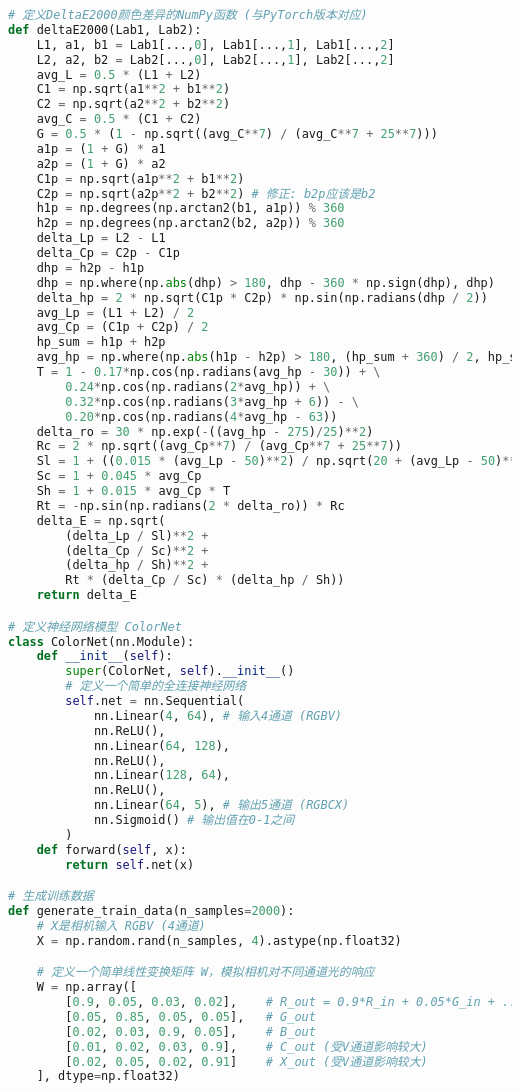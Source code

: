 \begin{lstlisting}[language=Python]
# 定义DeltaE2000颜色差异的NumPy函数 (与PyTorch版本对应)
def deltaE2000(Lab1, Lab2):
    L1, a1, b1 = Lab1[...,0], Lab1[...,1], Lab1[...,2]
    L2, a2, b2 = Lab2[...,0], Lab2[...,1], Lab2[...,2]
    avg_L = 0.5 * (L1 + L2)
    C1 = np.sqrt(a1**2 + b1**2)
    C2 = np.sqrt(a2**2 + b2**2)
    avg_C = 0.5 * (C1 + C2)
    G = 0.5 * (1 - np.sqrt((avg_C**7) / (avg_C**7 + 25**7)))
    a1p = (1 + G) * a1
    a2p = (1 + G) * a2
    C1p = np.sqrt(a1p**2 + b1**2)
    C2p = np.sqrt(a2p**2 + b2**2) # 修正: b2p应该是b2
    h1p = np.degrees(np.arctan2(b1, a1p)) % 360
    h2p = np.degrees(np.arctan2(b2, a2p)) % 360
    delta_Lp = L2 - L1
    delta_Cp = C2p - C1p
    dhp = h2p - h1p
    dhp = np.where(np.abs(dhp) > 180, dhp - 360 * np.sign(dhp), dhp)
    delta_hp = 2 * np.sqrt(C1p * C2p) * np.sin(np.radians(dhp / 2))
    avg_Lp = (L1 + L2) / 2
    avg_Cp = (C1p + C2p) / 2
    hp_sum = h1p + h2p
    avg_hp = np.where(np.abs(h1p - h2p) > 180, (hp_sum + 360) / 2, hp_sum / 2)
    T = 1 - 0.17*np.cos(np.radians(avg_hp - 30)) + \
        0.24*np.cos(np.radians(2*avg_hp)) + \
        0.32*np.cos(np.radians(3*avg_hp + 6)) - \
        0.20*np.cos(np.radians(4*avg_hp - 63))
    delta_ro = 30 * np.exp(-((avg_hp - 275)/25)**2)
    Rc = 2 * np.sqrt((avg_Cp**7) / (avg_Cp**7 + 25**7))
    Sl = 1 + ((0.015 * (avg_Lp - 50)**2) / np.sqrt(20 + (avg_Lp - 50)**2))
    Sc = 1 + 0.045 * avg_Cp
    Sh = 1 + 0.015 * avg_Cp * T
    Rt = -np.sin(np.radians(2 * delta_ro)) * Rc
    delta_E = np.sqrt(
        (delta_Lp / Sl)**2 +
        (delta_Cp / Sc)**2 +
        (delta_hp / Sh)**2 +
        Rt * (delta_Cp / Sc) * (delta_hp / Sh))
    return delta_E

# 定义神经网络模型 ColorNet
class ColorNet(nn.Module):
    def __init__(self):
        super(ColorNet, self).__init__()
        # 定义一个简单的全连接神经网络
        self.net = nn.Sequential(
            nn.Linear(4, 64), # 输入4通道 (RGBV)
            nn.ReLU(),
            nn.Linear(64, 128),
            nn.ReLU(),
            nn.Linear(128, 64),
            nn.ReLU(),
            nn.Linear(64, 5), # 输出5通道 (RGBCX)
            nn.Sigmoid() # 输出值在0-1之间
        )
    def forward(self, x):
        return self.net(x)

# 生成训练数据
def generate_train_data(n_samples=2000):
    # X是相机输入 RGBV (4通道)
    X = np.random.rand(n_samples, 4).astype(np.float32)

    # 定义一个简单线性变换矩阵 W，模拟相机对不同通道光的响应
    W = np.array([
        [0.9, 0.05, 0.03, 0.02],    # R_out = 0.9*R_in + 0.05*G_in + ...
        [0.05, 0.85, 0.05, 0.05],   # G_out
        [0.02, 0.03, 0.9, 0.05],    # B_out
        [0.01, 0.02, 0.03, 0.9],    # C_out (受V通道影响较大)
        [0.02, 0.05, 0.02, 0.91]    # X_out (受V通道影响较大)
    ], dtype=np.float32)


\end{lstlisting}
